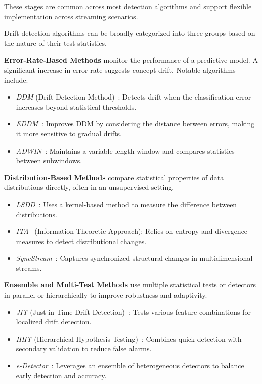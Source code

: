 These stages are common across most detection algorithms and support flexible
implementation across streaming scenarios.

Drift detection algorithms can be broadly categorized into three groups based
on the nature of their test statistics.

\textbf{Error-Rate-Based Methods} monitor the performance of a predictive model. 
A significant increase in error rate suggests concept drift. 
Notable algorithms include:

\begin{itemize}
    \item \emph{DDM} (Drift Detection Method)~\cite{ddm}: Detects drift when the 
    classification error increases beyond statistical thresholds.
    \item \emph{EDDM}~\cite{eddm}: Improves DDM by considering the distance between errors, 
    making it more sensitive to gradual drifts.
    \item \emph{ADWIN}~\cite{adwin}: Maintains a variable-length window and compares 
    statistics between subwindows.
\end{itemize}

\textbf{Distribution-Based Methods} compare statistical properties of data distributions directly,
often in an unsupervised setting.

\begin{itemize}
    \item \emph{LSDD}~\cite{lsdd}: Uses a kernel-based method to measure the difference 
    between distributions.
    \item \emph{ITA}~\cite{ita} (Information-Theoretic Approach): Relies on entropy and divergence 
    measures to detect distributional changes.
    \item \emph{SyncStream}~\cite{syncstream}: Captures synchronized structural changes in multidimensional streams.
\end{itemize}

\textbf{Ensemble and Multi-Test Methods} use multiple statistical tests or detectors in parallel or
hierarchically to improve robustness and adaptivity.

\begin{itemize}
    \item \emph{JIT} (Just-in-Time Drift Detection)~\cite{jit}: Tests various feature combinations 
    for localized drift detection.
    \item \emph{HHT} (Hierarchical Hypothesis Testing)~\cite{hht}: Combines quick detection with 
    secondary validation to reduce false alarms.
    \item \emph{e-Detector}~\cite{e_detector}: Leverages an ensemble of heterogeneous detectors to 
    balance early detection and accuracy.
\end{itemize}

